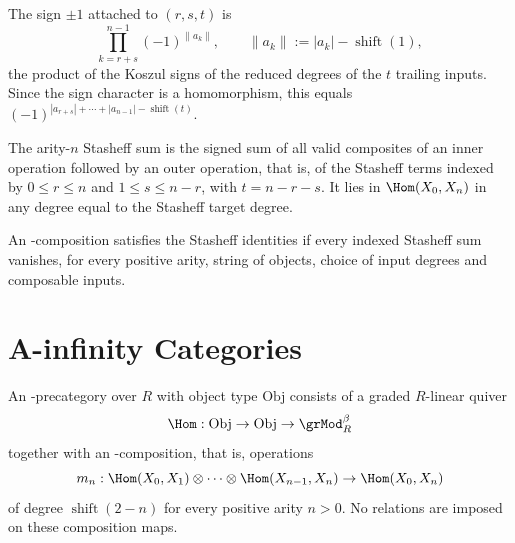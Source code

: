 \begin{definition}
\label{AInfinityTheory.stasheffSign}
\leanok
{}
The sign $\pm 1$ attached to $(r,s,t)$ is
\[
  \prod_{k=r+s}^{n-1} (-1)^{\|a_k\|},
  \qquad
  \|a_k\| := |a_k| - \operatorname{shift}(1),
\]
the product of the Koszul signs of the reduced degrees of the $t$ trailing
inputs. Since the sign character is a homomorphism, this equals
$(-1)^{|a_{r+s}| + \cdots + |a_{n-1}| - \operatorname{shift}(t)}$.
\end{definition}

\begin{definition}
\label{AInfinityTheory.indexedStasheffSum}
\leanok
{}
The arity-$n$ Stasheff sum is the signed sum of all valid composites of an inner
operation followed by an outer operation, that is, of the Stasheff terms indexed
by $0 \leq r \leq n$ and $1 \leq s \leq n - r$, with $t = n - r - s$. It lies in
$\Hom(X_0,X_n)$ in any degree equal to the Stasheff target degree.
\end{definition}

\begin{definition}
\label{AInfinityTheory.indexedSatisfiesStasheff}
\leanok
{}
An \Ainf{}-composition satisfies the Stasheff identities if every indexed
Stasheff sum vanishes, for every positive arity, string of objects, choice of
input degrees and composable inputs.
\end{definition}



\chapter{A-infinity Categories}

\begin{definition}
\label{AInfinityTheory.AInfinityCategoryStruct}
\leanok
{}
An \Ainf{}-precategory over $R$ with object type $\mathrm{Obj}$ consists of a
graded $R$-linear quiver
\[
  \Hom : \mathrm{Obj} \to \mathrm{Obj} \to \grMod_R^\beta
\]
together with an \Ainf{}-composition, that is, operations
\[
  m_n : \Hom(X_0, X_1) \otimes \dots \otimes \Hom(X_{n-1}, X_n) \to \Hom(X_0, X_n)
\]
of degree $\operatorname{shift}(2-n)$ for every positive arity $n>0$. No relations
are imposed on these composition maps.
\end{definition}

